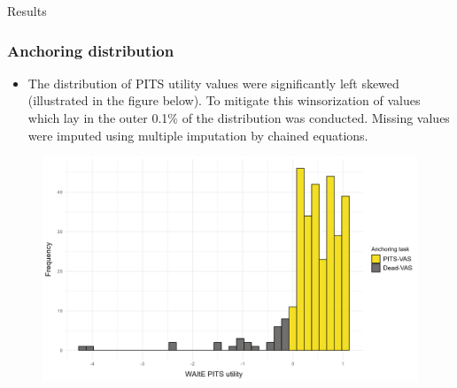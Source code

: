 \documentclass[t,compress,9pt,aspectratio=169]{beamer}
\begin{document}
\begin{frame}{Results}
    \frametitle{Anchoring distribution}
\begin{itemize}
    \item The distribution of PITS utility values were significantly left skewed (illustrated in the figure below). To mitigate this winsorization of values which lay in the outer 0.1\% of the distribution was conducted. Missing values were imputed using multiple imputation by chained equations. 
\end{itemize}
\begin{figure}[h]
    \centering
    \includegraphics[width=0.6\linewidth]{hist.png}
    \label{fig:OPUFcensoredpits_hist}
\end{figure}
\end{frame}
\end{document}
